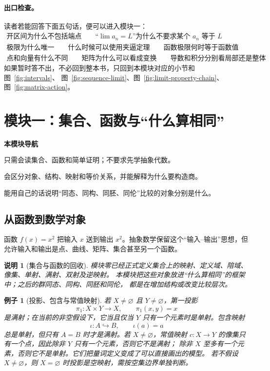 \documentclass[UTF8,fontset=none,a4paper,11pt]{ctexart}
\theoremstyle{foundation-definition}
\theoremstyle{foundation-theorem}
\theoremstyle{foundation-proposition}
\theoremstyle{foundation-example}
\newtheorem{example}[definition]{例子}
\theoremstyle{foundation-remark}
\newtheorem{remark}[definition]{说明}
\theoremstyle{foundation-theorem}
\newcommand{\moduleguide}[3]{%
\begin{mdframed}[backgroundcolor=definitionbg,linecolor=mainblue,linewidth=1.5pt,
  leftline=true,rightline=false,topline=false,bottomline=false,
  skipabove=9pt,skipbelow=10pt,innerleftmargin=10pt,innerrightmargin=8pt,
  innertopmargin=7pt,innerbottommargin=7pt]
{\sffamily\bfseries\color{mainblue}本模块导航}\par\smallskip
\begin{description}[style=nextline,leftmargin=2.8cm]
  \item[进入前] #1
  \item[本模块产出] #2
  \item[出口检查] #3
\end{description}
\end{mdframed}}
\begin{document}
\paragraph{出口检查。}
读者若能回答下面五句话，便可以进入模块一：
\[
\begin{gathered}
\text{开区间为什么不包括端点}\qquad
\text{“}\lim a_n=L\text{”为什么不要求某个 }a_n\text{ 等于 }L\\
\text{极限为什么唯一}\qquad
\text{什么时候可以使用夹逼定理}\qquad
\text{函数极限何时等于函数值}\\
\text{点和向量有什么不同}\qquad
\text{矩阵为什么可以看成变换}\qquad
\text{导数和积分分别看局部还是整体}
\end{gathered}
\]
如果暂时答不出，不必回到整本书，只回到本模块对应的小节和图~\ref{fig:intervals}、
图~\ref{fig:sequence-limit}、图~\ref{fig:limit-property-chain}、图~\ref{fig:matrix-action}。

\clearpage
\section{模块一：集合、函数与“什么算相同”}

\moduleguide{只需会读集合、函数和简单证明；不要求先学抽象代数。}{会区分对象、结构、映射和等价关系，并能解释为什么要构造商。}{能用自己的话说明“同态、同构、同胚、同伦”比较的对象分别是什么。}

\subsection{从函数到数学对象}

函数 \(f(x)=x^2\) 把输入 \(x\) 送到输出 \(x^2\)。抽象数学保留这个“输入--输出”思想，但允许输入和输出是点、曲线、矩阵、集合甚至另一个函数。

\begin{remark}[集合与函数的回收]
模块零已经正式定义集合上的映射、定义域、陪域、像集、单射、满射、双射及逆映射。
本模块把这些对象放进“什么算相同”的框架中；之后的群同态、同构、同胚和同伦，
都是在增加结构或改变比较层次。
\end{remark}

\begin{example}[投影、包含与常值映射]
若 \(X\ne\varnothing\) 且 \(Y\ne\varnothing\)，第一投影
\[
\pi_1:X\times Y\longrightarrow X,\qquad \pi_1(x,y)=x
\]
是满射；在当前的非空假设下，它当且仅当 \(Y\) 只有一个元素时是单射。包含映射
\[
\iota:A\hookrightarrow B,\qquad \iota(a)=a
\]
总是单射，但只有 \(A=B\) 时才是满射。若 \(X\ne\varnothing\)，常值映射
\(c:X\to Y\) 的像集只有一个点，因此除非 \(Y\) 只有一个元素，否则它不是满射；
除非 \(X\) 至多有一个元素，否则它不是单射。它们把量词定义变成了可以直接画出的模型。
若不假设 \(X\ne\varnothing\)，则 \(X=\varnothing\) 时投影是空映射，需按空集边界单独判断。
\end{example}
\end{document}
